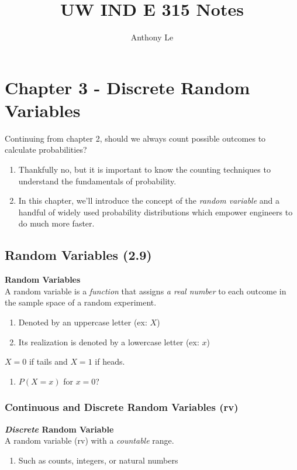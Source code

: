 \documentclass[../INDE315.tex]{subfiles}
\title{UW IND E 315 Notes}
\author{Anthony Le}
\begin{document}
\pagestyle{fancy}
\fancyhead{}


\section*{Chapter 3 - Discrete Random Variables}
Continuing from chapter 2, should we always count possible outcomes to calculate probabilities?
\begin{enumerate}
    \item Thankfully no, but it is important to know the counting techniques to understand the fundamentals of probability.
    \item In this chapter, we'll introduce the concept of the \emph{random variable} and a handful of widely used probability distributions which empower engineers to do much more faster.
\end{enumerate}
\subsection*{Random Variables (2.9)}

\begin{defn}
    \textbf{Random Variables} \\
    A random variable is a \emph{function} that assigns \emph{a real number} to each outcome in the sample space of a random experiment. 
    \begin{enumerate}
        \item Denoted by an uppercase letter (ex: $X$)
        \item Its realization is denoted by a lowercase letter (ex: $x$)
    \end{enumerate}
\end{defn}
\begin{exmp}
    $X = 0$ if tails and $X = 1$ if heads.
    \begin{enumerate}
        \item $P(X = x)$ for $x = 0$?
    \end{enumerate}
\end{exmp}

\subsubsection*{Continuous and Discrete Random Variables (rv)}
\begin{defn}
    \textbf{\emph{Discrete} Random Variable} \\
    A random variable (rv) with a \emph{countable} range. 
    \begin{enumerate}
        \item Such as counts, integers, or natural numbers
    \end{enumerate}
\end{defn}
\end{document}
